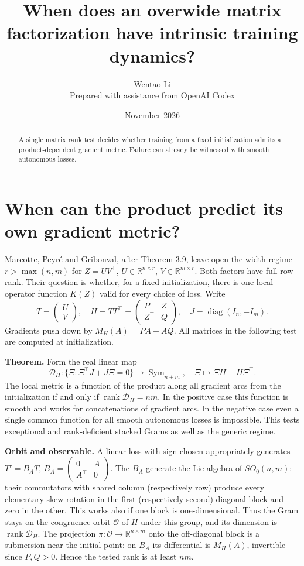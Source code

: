 \documentclass[10pt]{article}
\title{When does an overwide matrix factorization have intrinsic training dynamics?}
\author{Wentao Li\\{\small Prepared with assistance from OpenAI Codex}}
\date{November 2026}
\begin{document}
\maketitle
\begin{abstract}
A single matrix rank test decides whether training from a fixed initialization admits a product-dependent gradient metric. Failure can already be witnessed with smooth autonomous losses.
\end{abstract}
\section*{When can the product predict its own gradient metric?}
Marcotte, Peyré and Gribonval, after Theorem 3.9, leave open the width regime $r>\max(n,m)$ for $Z=UV^\top$, $U\in\mathbb R^{n\times r}$, $V\in\mathbb R^{m\times r}$. Both factors have full row rank. Their question is whether, for a fixed initialization, there is one local operator function $K(Z)$ valid for every choice of loss. Write
\[
 T=\begin{pmatrix}U\\ V\end{pmatrix},\quad
 H=TT^\top=\begin{pmatrix}P&Z\\ Z^\top&Q\end{pmatrix},\quad
 J=\operatorname{diag}(I_n,-I_m).
\]
Gradients push down by $M_H(A)=PA+AQ$. All matrices in the following test are computed at initialization.

\textbf{Theorem.} Form the real linear map
\[
 \mathcal D_H:\{\Xi:\Xi^\top J+J\Xi=0\}\longrightarrow
 \operatorname{Sym}_{n+m},\quad \Xi\mapsto\Xi H+H\Xi^\top .
\]
The local metric is a function of the product along all gradient arcs from the initialization if and only if $\operatorname{rank}\mathcal D_H=nm$. In the positive case this function is smooth and works for concatenations of gradient arcs. In the negative case even a single common function for all smooth autonomous losses is impossible. This tests exceptional and rank-deficient stacked Grams as well as the generic regime.

\textbf{Orbit and observable.} A linear loss with sign chosen appropriately generates $T'=B_A T$, $B_A=\left(\begin{smallmatrix}0&A\\ A^\top&0\end{smallmatrix}\right)$. The $B_A$ generate the Lie algebra of $SO_0(n,m)$: their commutators with shared column (respectively row) produce every elementary skew rotation in the first (respectively second) diagonal block and zero in the other. This works also if one block is one-dimensional. Thus the Gram stays on the congruence orbit $\mathcal O$ of $H$ under this group, and its dimension is $\operatorname{rank}\mathcal D_H$. The projection $\pi:\mathcal O\to\mathbb R^{n\times m}$ onto the off-diagonal block is a submersion near the initial point: on $B_A$ its differential is $M_H(A)$, invertible since $P,Q>0$. Hence the tested rank is at least $nm$.
\end{document}
